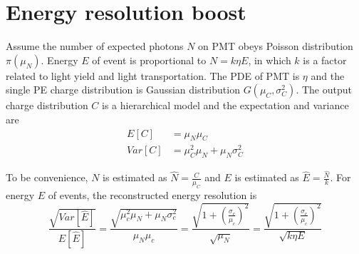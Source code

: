 \section{Energy resolution boost}
\label{Result}
Assume the number of expected photons $N$ on PMT obeys Poisson distribution $\pi(\mu_N)$. Energy $E$ of event is proportional to $N=k\eta E$, in which $k$ is a factor related to light yield and light transportation. The PDE of PMT is $\eta$ and the single PE charge distribution is Gaussian distribution $G(\mu_C,\sigma_C^2)$. The output charge distribution $C$ is a hierarchical model and the expectation and variance are
\begin{align}
    E[C]&=\mu_N\mu_C\\
    Var[C]&=\mu_C^2\mu_N+\mu_N\sigma_C^2
\end{align}

To be convenience, $N$ is estimated as $\hat{N}=\frac{C}{\mu_C}$ and $E$ is estimated as $\hat{E}=\frac{\hat{N}}{k}$. For  energy $E$ of events, the reconstructed energy resolution is 
\begin{equation}
    \frac{\sqrt{Var[\hat{E}]}}{E[\hat{E}]}=\frac{\sqrt{\mu_c^2\mu_N+\mu_N\sigma_c^2}}{\mu_N\mu_c}=\frac{\sqrt{1+(\frac{\sigma_c}{\mu_c})^2}}{\sqrt{\mu_N}}=\frac{\sqrt{1+(\frac{\sigma_c}{\mu_c})^2}}{\sqrt{k\eta E}}
\end{equation}

